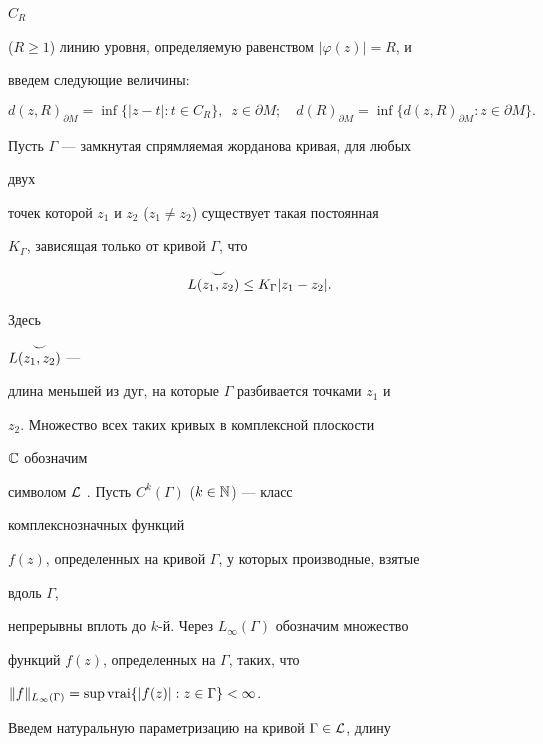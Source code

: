 $C_R$


($R\ge 1$) линию уровня, определяемую равенством $|\varphi(z)|=R$, и


введем следующие величины:


$$


d(z,R)_{\partial M}=\inf\{|z-t|:t\in C_R\}, \ \;z\in\partial M;\quad


d(R)_{\partial M}=\inf\{d(z,R)_{\partial M}:z\in\partial M\}.


$$





Пусть $\Gamma$ --- замкнутая спрямляемая жорданова кривая, для любых


двух


точек которой $z_1$ и $z_2$ ($z_1\ne z_2$) существует такая постоянная


$K_\Gamma$, зависящая только от кривой $\Gamma$, что


\begin{equation}


L\overset{\raisebox{-1mm}{$\displaystyle\smile$}}{(z_1,z_2)}{}


\le K_\Gamma|z_1-z_2|.


\end{equation}


Здесь


$L\overset{\raisebox{-1mm}{$\displaystyle\smile$}}{(z_1,z_2)}{}$ ---


длина меньшей из дуг, на которые $\Gamma$ разбивается точками $z_1$ и


$z_2$. Множество всех таких кривых в комплексной плоскости


$\Bbb C$ обозначим


символом $\cal L$ \cite{6}. Пусть $C^k(\Gamma)$ ($k\in\Bbb N$) --- класс


комплекснозначных функций


$f(z)$, определенных на кривой $\Gamma$, у которых производные, взятые


вдоль $\Gamma$,


непрерывны вплоть до $k$-й. Через $L_\infty(\Gamma)$ обозначим множество


функций $f(z)$, определенных на $\Gamma$, таких, что


$\|f\|_{L_\infty(\Gamma)}=\supvrai\{|f(z)|:z\in\Gamma\}<\infty$.





Введем натуральную параметризацию на кривой $\Gamma\in\cal L$, длину


